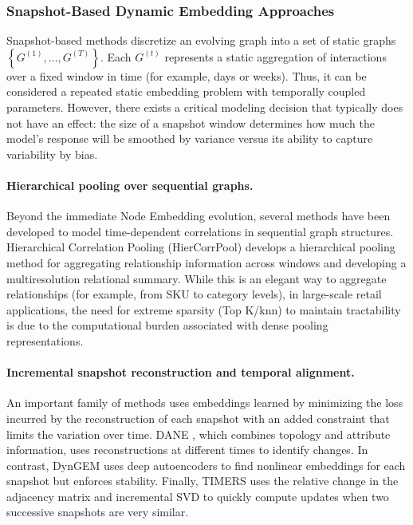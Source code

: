\subsubsection{Snapshot-Based Dynamic Embedding Approaches}
Snapshot-based methods discretize an evolving graph into a set of static graphs $\left\{G^{\left(1\right)}, \ldots,G^{\left(T\right)}\right\}$. Each $G^{\left(t\right)}$ represents a static aggregation of interactions over a fixed window in time (for example, days or weeks). Thus, it can be considered a repeated static embedding problem with temporally coupled parameters. However, there exists a critical modeling decision that typically does not have an effect: the size of a snapshot window determines how much the model's response will be smoothed by variance versus its ability to capture variability by bias.

\paragraph{Hierarchical pooling over sequential graphs.}
Beyond the immediate Node Embedding evolution, several methods have been developed to model time-dependent correlations in sequential graph structures. Hierarchical Correlation Pooling (HierCorrPool)\cite{wang2024hiercorrpool} develops a hierarchical pooling method for aggregating relationship information across windows and developing a multiresolution relational summary. While this is an elegant way to aggregate relationships (for example, from SKU to category levels), in large-scale retail applications, the need for extreme sparsity (Top K/knn) to maintain tractability is due to the computational burden associated with dense pooling representations.
\paragraph{Incremental snapshot reconstruction and temporal alignment.}
An important family of methods uses embeddings learned by minimizing the loss incurred by the reconstruction of each snapshot with an added constraint that limits the variation over time. DANE \cite{li2017dane}, which combines topology and attribute information, uses reconstructions at different times to identify changes. In contrast, DynGEM \cite{goyal2018dyngem} uses deep autoencoders to find nonlinear embeddings for each snapshot but enforces stability. Finally, TIMERS \cite{zhang2018timers} uses the relative change in the adjacency matrix and incremental SVD to quickly compute updates when two successive snapshots are very similar.

